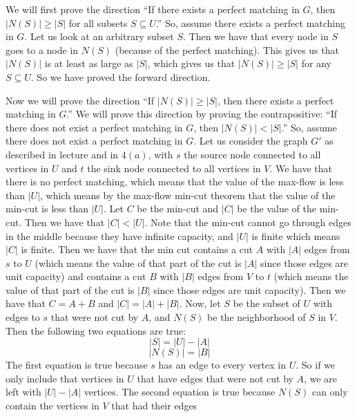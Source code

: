 \documentclass{article}
\begin{document}
\begin{description}
        We will first prove the direction ``If there exists a perfect matching
        in $G$, then $|N(S)| \ge |S|$ for all subsets $S \subseteq U$.'' So,
        assume there exists a perfect matching in $G$. Let us look at an
        arbitrary subset $S$. Then we have that every node in $S$ goes to a node
        in $N(S)$ (because of the perfect matching). This gives us that $|N(S)|$ is at
        least as large as $|S|$, which gives us that $|N(S)| \ge |S|$ for any
        $S \subseteq U$. So we have proved the forward direction.

        Now we will prove the direction ``If $|N(S)| \ge |S|$, then there exists
        a perfect matching in $G$.'' We will prove this direction by proving the
        contrapositive: ``If there does not exist a perfect matching in $G$,
        then $|N(S)| < |S|$.'' So, assume there does not exist a perfect
        matching in $G$. Let us consider the graph $G'$ as described in lecture
        and in $4(a)$, with $s$ the source node connected to all vertices in $U$
        and $t$ the sink node connected to all vertices in $V$. We have that
        there is no perfect matching, which means that the value of the max-flow
        is less than $|U|$, which means by the max-flow min-cut theorem that the
        value of the min-cut is less than $|U|$. Let $C$ be the min-cut and
        $|C|$ be the value of the min-cut. Then we have that $|C| < |U|$. Note that the min-cut cannot go
        through edges in the middle because they have infinite capacity, and
        $|U|$ is finite which means $|C|$ is finite. Then we have that the min
        cut contains a cut $A$ with $|A|$ edges from $s$ to $U$ (which means the value of that
        part of the cut is $|A|$ since those edges are unit capacity) and
        contains a cut $B$ with $|B|$ edges from $V$ to $t$ (which means the value of that
        part of the cut is $|B|$ since those edges are unit capacity). Then we
        have that $C = A + B$ and $|C| = |A| + |B|$. Now, let $S$ be the subset of $U$ with edges to
        $s$ that were not cut by $A$, and $N(S)$ be
        the neighborhood of $S$ in $V$. Then the following two equations are
        true:
        \[ |S| = |U| - |A| \]
        \[ |N(S)| = |B| \]
        The first equation is true because $s$ has an edge to every vertex in $U$. So if
        we only include that vertices in $U$ that have edges that were not cut
        by $A$, we are left with $|U| - |A|$ vertices. The second equation is true
        because $N(S)$ can only contain the vertices in $V$ that had their edges

\end{description}
\end{document}
